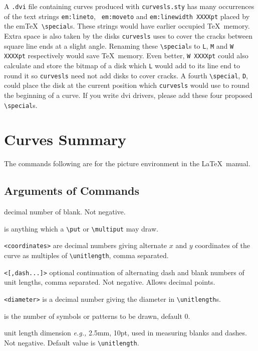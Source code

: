 A {\tt .dvi} file containing curves produced with {\tt curvesls.sty}
has many occurrences of the text strings {\tt em:lineto}, {\tt
em:moveto} and {\tt em:linewidth XXXXpt} placed by the em\TeX\
\verb?\special?s. These strings would have earlier occupied \TeX\
memory. Extra space is also taken by the disks {\tt curvesls} uses to
cover the cracks between square line ends at a slight angle. Renaming
these \verb?\special?s to {\tt L}, {\tt M} and {\tt W XXXXpt}
respectively would save \TeX\ memory. Even better, {\tt W XXXXpt}
could also calculate and store the bitmap of a disk which {\tt L}
would add to its line end to round it so {\tt curvesls} need not add
disks to cover cracks. A fourth \verb?\special?, {\tt D}, could place
the disk at the current position which {\tt curvesls} would use to
round the beginning of a curve. If you write dvi drivers, please add
these four proposed \verb?\special?s.


 
  
  \section{Curves Summary} 
  \label{summary}
  The commands following are for the picture environment in the \LaTeX\ 
manual\footnotemark[1].  
  \makeatletter
  \newenvironment{hanging}{\list{}{\topsep\itemsep \advance\topsep-\parskip
    \parsep\itemsep \itemsep\z@skip \partopsep\parskip
    \ifdim\parindent>\z@ \@tempdimb\parindent \else \@tempdimb1.5 em\fi
    \leftmargin\@tempdimb \listparindent-\@tempdimb \itemindent-\@tempdimb
    \rightmargin\z@ \labelsep\z@ \labelwidth\z@ }\item[]}%
    {\endlist \addvspace\parsep}
  \makeatother


    \subsection{Arguments of Commands}

    \begin{hanging}

{\tt <blank length>} decimal number of {\tt <unit len>} blank. Not negative.

     {\tt <character or symbol>} is anything which a \verb?\put? or
\verb?\multiput? may draw.

    {\tt <coordinates>} are decimal numbers giving alternate $x$ and $y$
  coordinates of the curve as multiples of \verb?\unitlength?, comma
separated.

{\tt <[,dash...]>} optional continuation of alternating dash and blank numbers
of unit lengths, comma separated. Not negative. Allows decimal points.

 {\tt <diameter>} is a decimal number giving the diameter in
  \verb?\unitlength?s.

    {\tt <symbol count>} is the number of symbols or patterns to be drawn,
default 0.

  {\tt <unit len>} unit length dimension {\it e.g.\/,} 2.5mm, 10pt, used in
measuring blanks and dashes. Not negative. Default value is
\verb?\unitlength?.

     \end{hanging}



